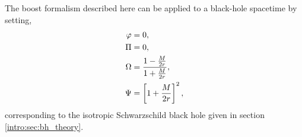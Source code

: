 The boost formalism described here can be applied to a black-hole spacetime by setting,
\begin{align}
\varphi&=0,\\
\Pi&=0,\\
\Omega &= \frac{1-\frac{M}{2r}}{1+\frac{M}{2r}}, \\
 \Psi &= \left[1+\frac{M}{2r}\right]^2,
 \end{align}
 corresponding to the isotropic Schwarzschild black hole given in section \ref{intro:sec:bh_theory}.



